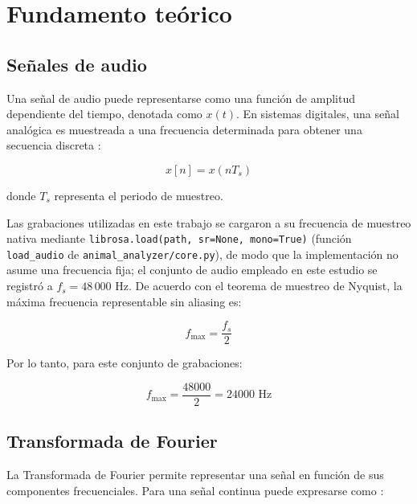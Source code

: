 
\section{Fundamento teórico}

\subsection{Señales de audio}

Una señal de audio puede representarse como una función de amplitud dependiente del tiempo, denotada como $x(t)$. En sistemas digitales, una señal analógica es muestreada a una frecuencia determinada para obtener una secuencia discreta \cite{oppenheim}:

\begin{equation}
x[n] = x(nT_s)
\end{equation}

donde $T_s$ representa el periodo de muestreo.

Las grabaciones utilizadas en este trabajo se cargaron a su frecuencia de muestreo nativa mediante \texttt{librosa.load(path, sr=None, mono=True)} (función \texttt{load\_audio} de \texttt{animal\_analyzer/core.py}), de modo que la implementación no asume una frecuencia fija; el conjunto de audio empleado en este estudio se registró a $f_s = 48\,000$ Hz. De acuerdo con el teorema de muestreo de Nyquist, la máxima frecuencia representable sin aliasing es:

\begin{equation}
f_{\max} = \frac{f_s}{2}
\end{equation}

Por lo tanto, para este conjunto de grabaciones:

\begin{equation}
f_{\max} = \frac{48000}{2} = 24000\text{ Hz}
\end{equation}

\subsection{Transformada de Fourier}

La Transformada de Fourier permite representar una señal en función de sus componentes frecuenciales. Para una señal continua puede expresarse como \cite{oppenheim}:

